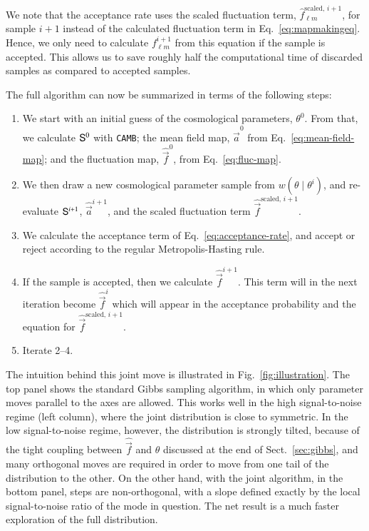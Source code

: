 \documentclass[twocolumn]{aa}
\def\camb{\texttt{CAMB}}
\renewcommand{\a}[0]{\vec{a}}
\newcommand{\f}[0]{\vec{f}}
\renewcommand{\S}[0]{\tens{S}}
\begin{document}
We note that the acceptance rate uses the scaled fluctuation term, $\hat{f}_{\ell m}^{\textrm{scaled},\, i+1}$, for sample $i+1$ instead of the calculated fluctuation term in Eq.~\eqref{eq:mapmakingeq}. Hence, we only need to calculate $f_{\ell m}^{i+1}$ from this equation if the sample is accepted. This allows us to save roughly half the computational time of discarded samples as compared to accepted samples.

The full algorithm can now be summarized in terms of the following steps:
\begin{enumerate}
    \item We start with an initial guess of the cosmological parameters, $\theta^0$. From that, we calculate $\S^0$ with \camb; the mean field map, $\hat{\a}^0$ from Eq.~\eqref{eq:mean-field-map}; and the fluctuation map, $\hat{\f}^0$, from Eq.~\eqref{eq:fluc-map}.
    \item We then draw a new cosmological parameter sample from $w(\theta\mid\theta^i)$, and re-evaluate $\S^{i+1}$, $\hat{\a}^{i+1}$, and the scaled fluctuation term $\hat{\f}^{\textrm{scaled},\, i+1}$.
    \item We calculate the acceptance term of Eq.~\eqref{eq:acceptance-rate}, and accept or reject according to the regular Metropolis-Hasting rule.
    \item If the sample is accepted, then we calculate $\hat{\f}^{i+1}$. This term will in the next iteration become $\hat{\f}^{i}$ which will appear in the acceptance probability and the equation for $\hat{\f}^{\textrm{scaled},\, i+1}$. 
    \item Iterate 2--4.
\end{enumerate}

The intuition behind this joint move is illustrated in Fig.~\ref{fig:illustration}. The top panel shows the standard Gibbs sampling algorithm, in which only parameter moves parallel to the axes are allowed. This works well in the high signal-to-noise regime (left column), where the joint distribution is close to symmetric. In the low signal-to-noise regime, however, the distribution is strongly tilted, because of the tight coupling between $\hat{\f}$ and $\theta$ discussed at the end of Sect.~\ref{sec:gibbs}, and many orthogonal moves are required in order to move from one tail of the distribution to the other. On the other hand, with the joint algorithm, in the bottom panel, steps are non-orthogonal, with a slope defined exactly by the local signal-to-noise ratio of the mode in question. The net result is a much faster exploration of the full distribution.
\end{document}

